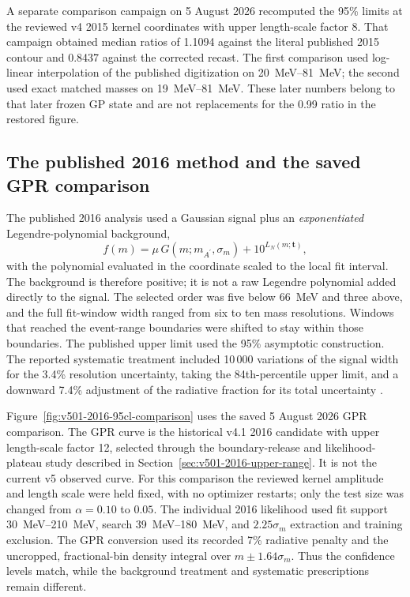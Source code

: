 A separate comparison campaign on 5 August 2026 recomputed the 95\%
limits at the reviewed v4 2015 kernel coordinates with upper
length-scale factor 8. That campaign obtained median ratios of 1.1094
against the literal published 2015 contour and 0.8437 against the
corrected recast. The first comparison used log-linear interpolation
of the published digitization on \SIrange{20}{81}{MeV}; the second
used exact matched masses on \SIrange{19}{81}{MeV}. These later
numbers belong to that later frozen GP state and are not replacements
for the 0.99 ratio in the restored figure.

\subsection{The published 2016 method and the saved GPR comparison}
\label{sec:v501-2016-published-method}

The published 2016 analysis used a Gaussian signal plus an
\emph{exponentiated} Legendre-polynomial background,
\begin{equation}
 f(m)=\mu\,G(m;m_{A^\prime},\sigma_m)
      +10^{L_N(m;\boldsymbol t)},
 \label{eq:v501-2016-polynomial-model}
\end{equation}
with the polynomial evaluated in the coordinate scaled to the local
fit interval. The background is therefore positive; it is not a raw
Legendre polynomial added directly to the signal. The selected order
was five below \SI{66}{MeV} and three above, and the full fit-window
width ranged from six to ten mass resolutions. Windows that reached
the event-range boundaries were shifted to stay within those
boundaries. The published upper limit used the 95\% asymptotic
\CLs{} construction. The reported systematic treatment included
10\,000 variations of the signal width for the 3.4\% resolution
uncertainty, taking the 84th-percentile upper limit, and a downward
7.4\% adjustment of the radiative fraction for its total uncertainty
\cite{HPS2016PromptLong}.

Figure~\ref{fig:v501-2016-95cl-comparison} uses the saved
5 August 2026 GPR comparison. The GPR curve is the historical v4.1
2016 candidate with upper length-scale factor 12, selected through
the boundary-release and likelihood-plateau study described in
Section~\ref{sec:v501-2016-upper-range}. It is not the current
v5 observed curve. For this comparison the reviewed kernel amplitude
and length scale were held fixed, with no optimizer restarts; only
the \CLs{} test size was changed from $\alpha=0.10$ to $0.05$.
The individual 2016 likelihood used fit support
\SIrange{30}{210}{MeV}, search \SIrange{39}{180}{MeV}, and
$2.25\sigma_m$ extraction and training exclusion. The GPR conversion
used its recorded 7\% radiative penalty and the uncropped,
fractional-bin density integral over $m\pm1.64\sigma_m$.
Thus the confidence levels match, while the background treatment and
systematic prescriptions remain different.

